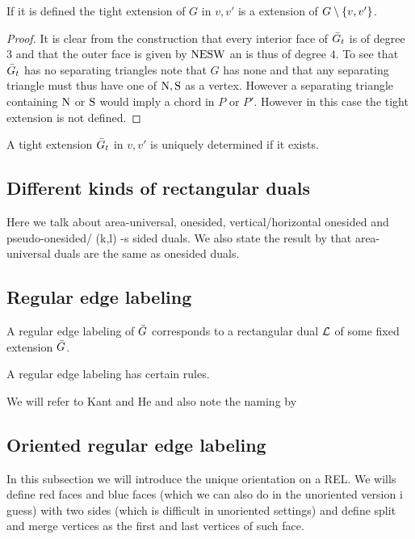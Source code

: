 \begin{lemma}
  If it is defined the tight extension of $G$ in $v, v'$ is a extension of $G \setminus \left\lbrace {v, v'} \right\rbrace$.
\end{lemma}
\begin{proof}
  It is clear from the construction that every interior face of $\bar{G}_t$ is of degree 3 and that the outer face is given by $\mathrm{N} \mathrm{E} \mathrm{S} \mathrm{W}$ an is thus of degree $4$.
  To see that $\bar{G}_t$ has no separating triangles note that $G$ has none and that any separating triangle must thus have one of $\mathrm{N}, \mathrm{S}$ as a vertex. However a separating triangle containing $\mathrm{N}$ or $\mathrm{S}$ would imply a chord in $P$ or $P'$. However in this case the tight extension is not defined.
\end{proof}

A tight extension $\bar{G}_t$ in $v , v'$ is uniquely determined if it exists.

\subsection{Different kinds of rectangular duals}
Here we talk about area-universal, onesided, vertical/horizontal onesided and pseudo-onesided/ (k,l) -s sided duals.
We also state the result by \cite{Eppstein2012} that area-universal duals are the same as onesided duals.


\subsection{Regular edge labeling}

A regular edge labeling  of $\bar{G}$ corresponds to a rectangular dual $\mathcal{L}$ of some fixed extension $\bar{G}$.

A regular edge labeling has certain rules.

We will refer to Kant and He \cite{Kant1997} and also note the naming by \cite{Fusy2006}


\subsection{Oriented regular edge labeling}
In this subsection we will introduce the unique orientation on a REL. We wills define red faces and blue faces (which we can also do in the unoriented version i guess) with two sides (which is difficult in unoriented settings) and define split and merge vertices as the first and last vertices of such face.

